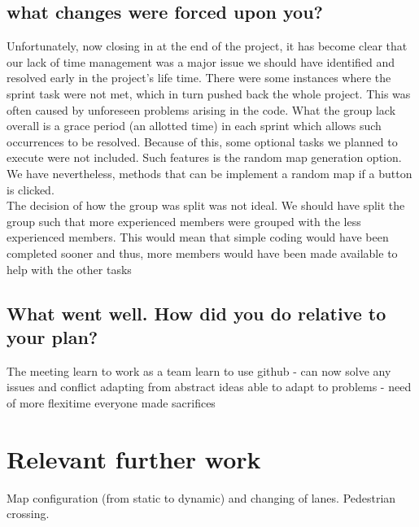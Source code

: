 \documentclass{article}[11pt,Tahoma]
\begin{document}
\begin{Abstract}
		\subsection{what changes were forced upon you? }
			Unfortunately, now closing in at the end of the project, it has become clear that our lack of time management was a major issue we should have identified and resolved early in the project's life time. There were some instances where the sprint task were not met, which in turn pushed back the whole project. This was often caused by  unforeseen problems arising in the code. What the group lack overall is a grace period (an allotted time) in each sprint which allows such occurrences to be resolved. Because of this, some optional tasks we planned to execute were not included. Such features is the random map generation option.  We have nevertheless, methods that can be implement a random map if a button is clicked. \\
			The decision of how the group was split was not ideal. We should have split the group such that more experienced members were grouped with the less experienced members.  This would mean that simple  coding would have been completed sooner and thus, more members would have been made available to help with the other tasks
		\subsection{What went well.  How did you do relative to your plan?}
		The meeting 	
		learn to work as a team
		learn to use github -  can now solve any issues and conflict
		adapting from abstract ideas
		able to adapt to problems - need of more flexitime 
		everyone made sacrifices 
		
	\section{Relevant further work}  
			Map configuration (from static to dynamic) and changing of lanes. Pedestrian crossing.

\end{Abstract}
\end{document}
